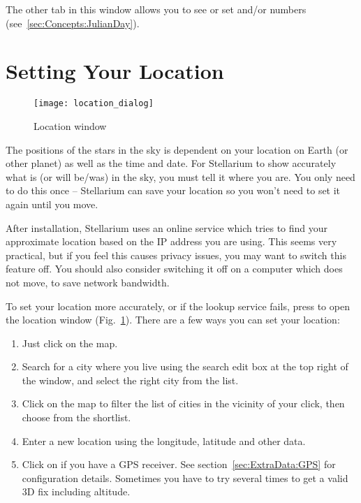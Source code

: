 The other tab in this window allows you to see or set
 and/or  numbers
(see~\ref{sec:Concepts:JulianDay}).

\section{Setting Your Location}
\label{sec:gui:location}

\begin{figure}[htb]
\centering\texttt{[image: location\_dialog]}
\caption{Location window}
\label{fig:gui:location}
\end{figure}

The positions of the stars in the sky is dependent on your location on
Earth (or other planet) as well as the time and date. For Stellarium to
show accurately what is (or will be/was) in the sky, you must tell it
where you are. You only need to do this once -- Stellarium can save your
location so you won't need to set it again until you move.

After installation, Stellarium uses an online service which tries to
find your approximate location based on the IP address you are
using. This seems very practical, but if you feel this causes privacy
issues, you may want to switch this feature off. You should also consider switching it off on a computer which does not move, to save network bandwidth.

To set your location more accurately, or if the lookup service fails,
press  to open the location window (Fig.~\ref{fig:gui:location}). 
There are a few ways you can set your location:

\begin{enumerate}
\item Just click on the map.
\item Search for a city where you live using the search edit box at
  the top right of the window, and select the right city from the
  list.
\item Click on the map to filter the list of cities in the vicinity of
  your click, then choose from the shortlist.
\item Enter a new location using the longitude, latitude and other
  data.
\item Click on  if you have a GPS receiver. 
  See section~\ref{sec:ExtraData:GPS} for configuration details. 
  Sometimes you have to try several times to get a valid 3D fix including altitude.
\end{enumerate}

